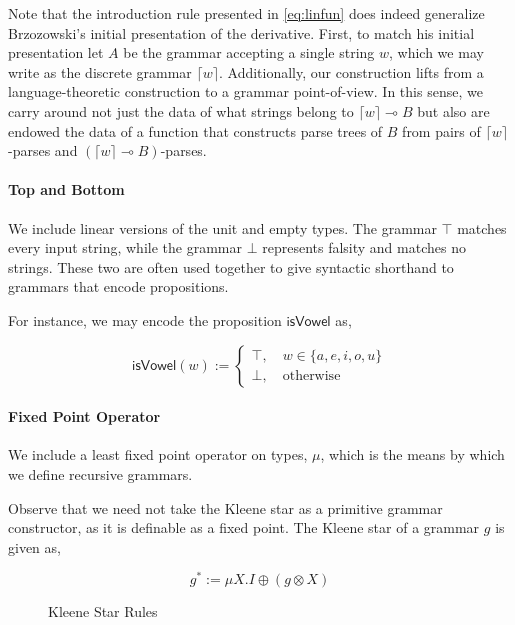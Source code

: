 \documentclass[acmsmall,screen,nonacm]{acmart}
\newcommand{\lto}{\multimap}
\begin{document}
Note that the introduction rule presented in \cref{eq:linfun} does indeed
generalize Brzozowski's initial presentation of the derivative. First, to match
his initial presentation
let $A$ be the grammar accepting a single string $w$, which we may write as the
discrete grammar $\lceil w \rceil$.
Additionally, our construction lifts from a language-theoretic construction
to a grammar point-of-view.
In this sense, we carry around not just the data of what strings belong to
$\lceil w \rceil \lto B$ but also are endowed the data of a function that
constructs parse trees of $B$ from pairs of $\lceil w \rceil$-parses and
$(\lceil w \rceil \lto B)$-parses.

\paragraph{Top and Bottom}
We include linear versions of the unit and empty types. The
grammar $\top$ matches every input string, while the grammar
$\bot$ represents falsity and matches no strings. These two
are often used together to give syntactic shorthand to
grammars that encode propositions.

For instance, we may encode the proposition
$\mathsf{isVowel}$ as,

\[
  \mathsf{isVowel}(w) :=
    \begin{cases}
      \top, \quad w \in \{a, e, i, o, u\} \\
      \bot, \quad \text{otherwise}
    \end{cases}
\]

\paragraph{Fixed Point Operator}
We include a least fixed point operator on types, $\mu$, which is the means by
which we define recursive grammars.

Observe that we need not take the Kleene star as a primitive
grammar constructor, as it is definable as a fixed point.
The Kleene star of a grammar $g$ is given as,

\[
  g^{*} := \mu X . I \oplus (g \otimes X)
\]

\begin{figure}[h!]
\caption{Kleene Star Rules}
\label{fig:star}
\end{figure}
\end{document}

